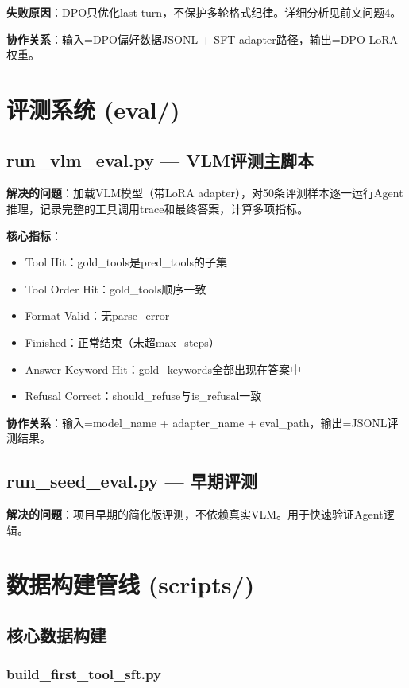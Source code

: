 \documentclass[fontset=none,11pt,a4paper]{ctexart}
\begin{document}
\textbf{失败原因}：DPO只优化last-turn，不保护多轮格式纪律。详细分析见前文问题4。

\textbf{协作关系}：输入=DPO偏好数据JSONL + SFT adapter路径，输出=DPO LoRA权重。

\section{评测系统 (eval/)}

\subsection{run\_vlm\_eval.py --- VLM评测主脚本}

\textbf{解决的问题}：加载VLM模型（带LoRA adapter），对50条评测样本逐一运行Agent推理，记录完整的工具调用trace和最终答案，计算多项指标。

\textbf{核心指标}：
\begin{itemize}[nosep]
    \item Tool Hit：gold\_tools是pred\_tools的子集
    \item Tool Order Hit：gold\_tools顺序一致
    \item Format Valid：无parse\_error
    \item Finished：正常结束（未超max\_steps）
    \item Answer Keyword Hit：gold\_keywords全部出现在答案中
    \item Refusal Correct：should\_refuse与is\_refusal一致
\end{itemize}

\textbf{协作关系}：输入=model\_name + adapter\_name + eval\_path，输出=JSONL评测结果。

\subsection{run\_seed\_eval.py --- 早期评测}

\textbf{解决的问题}：项目早期的简化版评测，不依赖真实VLM。用于快速验证Agent逻辑。

\section{数据构建管线 (scripts/)}

\subsection{核心数据构建}

\subsubsection{build\_first\_tool\_sft.py}
\end{document}
